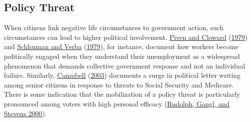 \documentclass[
  12pt,
]{article}
\begin{document}
\hypertarget{policy-threat}{%
\subsection*{Policy Threat}\label{policy-threat}}

When citizens link negative life circumstances to government action, such circumstances can lead to higher political involvement. \protect\hyperlink{ref-Piven1979}{Piven and Cloward} (\protect\hyperlink{ref-Piven1979}{1979}) and \protect\hyperlink{ref-Schlozman1979}{Schlozman and Verba} (\protect\hyperlink{ref-Schlozman1979}{1979}), for instance, document how workers become politically engaged when they understand their unemployment as a widespread phenomenon that demands collective government response and not an individual failure. Similarly, \protect\hyperlink{ref-Campbell2003a}{Campbell} (\protect\hyperlink{ref-Campbell2003a}{2003}) documents a surge in political letter writing among senior citizens in response to threats to Social Security and Medicare. There is some indication that the mobilization of a policy threat is particularly pronounced among voters with high personal efficacy (\protect\hyperlink{ref-Rudolph2000}{Rudolph, Gangl, and Stevens 2000}).
\end{document}
